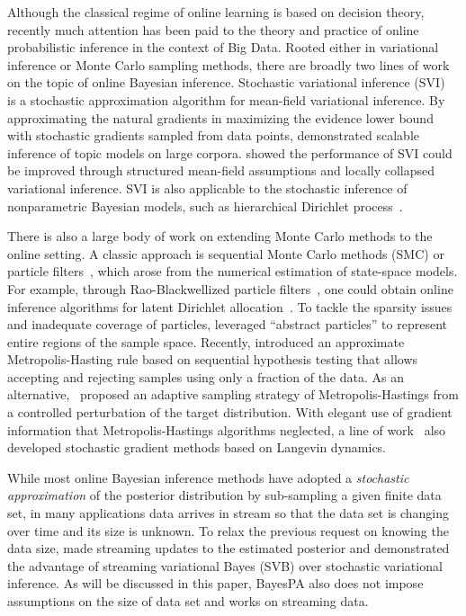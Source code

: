 \documentclass[twoside,11pt]{article}
\begin{document}
Although the classical regime of online learning is based on decision theory, recently much attention has been paid to the theory and practice of online probabilistic inference in the context of Big Data. Rooted either in variational inference or Monte Carlo sampling methods, there are broadly two lines of work on the topic of online Bayesian inference. Stochastic variational inference (SVI)~\citep{hoffman2013stochastic} is a stochastic approximation algorithm for mean-field variational inference. By approximating the natural  gradients in maximizing the evidence lower bound with stochastic gradients sampled from data points, \cite{hoffman2013stochastic} demonstrated scalable inference of topic models on large corpora. \cite{mimno2012sparse} showed the performance of SVI could be improved through structured mean-field assumptions and locally collapsed variational inference. SVI is also applicable to the stochastic inference of nonparametric Bayesian models, such as hierarchical Dirichlet process~\citep{wang2011onlinealgo, wang2012truncation}.

There is also a large body of work on extending Monte Carlo methods to the online setting. A classic approach is sequential Monte Carlo methods (SMC) or particle filters~\citep{doucet2009tutorial}, which arose from the numerical estimation of state-space models. For example,  through Rao-Blackwellized particle filters~\citep{doucet2000rao}, one could obtain online inference algorithms for latent Dirichlet allocation~\citep{canini2009online}. To tackle the sparsity issues and inadequate coverage of particles, \cite{steinhardt2014filtering} leveraged ``abstract particles'' to represent entire regions of the sample space. Recently, \cite{korattikara2014austerity} introduced an approximate Metropolis-Hasting rule based on sequential hypothesis testing that allows accepting and rejecting samples using only a fraction of the data. As an alternative,~\cite{bardenet2014towards} proposed an adaptive sampling strategy of Metropolis-Hastings from a controlled perturbation of the target distribution. With elegant use of gradient information that Metropolis-Hastings algorithms neglected, a line of work~\citep{welling2011bayesian, welling2012mc, patterson2013stochastic} also developed stochastic gradient methods based on Langevin dynamics.

While most online Bayesian inference methods have adopted a \emph{stochastic approximation} of the posterior distribution by sub-sampling a given finite data set, in many applications data arrives in stream so that the data set is changing over time and its size is unknown. To relax the previous request on knowing the data size, \cite{broderick2013streaming} made streaming updates to the estimated posterior and demonstrated the advantage of streaming variational Bayes (SVB) over stochastic variational inference. As will be discussed in this paper, BayesPA also does not impose assumptions on the size of data set and works on streaming data.
\end{document}
